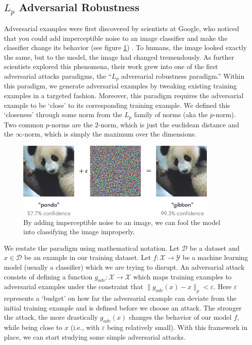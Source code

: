 \documentclass{article}
\newcommand{\X}{\mathcal{X}}
\newcommand{\Y}{\mathcal{Y}}
\newcommand{\D}{\mathcal{D}}
\begin{document}
\subsection{$L_p$ Adversarial Robustness}
\label{sub:lp}

Adversarial examples were first discovered by scientists at Google, who noticed that you could add imperceptible noise to an image classifier and make the classifier change its behavior (see figure \ref{fig:openai_panda}) \cite{szegedy2014intriguing}. To humans, the image looked exactly the same, but to the model, the image had changed tremendously. As further scientists explored this phenomena, their work grew into one of the first adversarial attacks paradigms, the ``$L_p$ adversarial robustness paradigm.'' Within this paradigm, we generate adversarial examples by tweaking existing training examples in a targeted fashion. Moreover, this paradigm requires the adversarial example to be `close' to its corresponding training example. We defined this `closeness' through some norm from the $L_p$ family of norms (aka the $p$-norm). Two common $p$-norms are the $2$-norm, which is just the euclidean distance and the $\infty$-norm, which is simply the maximum over the dimensions.
\begin{figure}
    \centering
    \includegraphics[width=10cm]{images/openai_panda.png}
    \caption{By adding imperceptible noise to an image, we can fool the model into classifying the image improperly.}
    \label{fig:openai_panda}
\end{figure}

We restate the paradigm using mathematical notation. Let $\D$ be a dataset and $x \in \D$ be an example in our training dataset. Let $f: \X \to \Y$ be a machine learning model (usually a classifier) which we are trying to disrupt. An adversarial attack consists of defining a function $g_{adv}: \X \to \X$ which maps training examples to adversarial examples under the constraint that $\|g_{adv}(x) - x\|_p < \varepsilon$. Here $\varepsilon$ represents a `budget' on how far the adversarial example can deviate from the initial training example and is defined before we choose an attack. The stronger the attack, the more drastically $g_{adv}(x)$ changes the behavior of our model $f$, while being close to $x$ (i.e., with $\varepsilon$ being relatively small). With this framework in place, we can start studying some simple adversarial attacks.
\end{document}
